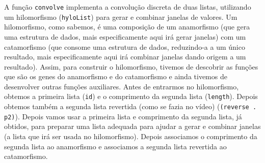 \documentclass[11pt, a4paper, fleqn]{article}
\begin{document}
\noindent A função \texttt{convolve} implementa a convolução discreta de duas listas, utilizando um hilomorfismo (\texttt{hyloList}) para gerar e combinar janelas de valores. Um hilomorfismo, como sabemos, é uma composição de um anamorfismo (que gera uma estrutura de dados, mais especificamente aqui irá gerar janelas) com um catamorfismo (que consome uma estrutura de dados, reduzindo-a a um único resultado, mais especificamente aqui irá combinar janelas dando origem a um resultado). Assim, para construir o hilomorfismo, tivemos de descobrir as funções que são os genes do anamorfismo e do catamorfismo e ainda tivemos de desenvolver outras funções
auxiliares. Antes de entrarmos no hilomorfismo, obtemos a primeira lista (\texttt{id}) e o comprimento da segunda lista (\texttt{length}).
Depois obtemos também a segunda lista revertida (como se fazia no vídeo) (\texttt{(reverse . p2)}). Depois vamos usar a primeira lista e comprimento da segunda lista, já obtidos, para preparar
uma lista adequada para ajudar a gerar e combinar janelas (a lista que irá ser usada no hilomorfismo). Depois associamos o comprimento da segunda lista ao anamorfismo e associamos a segunda lista revertida ao
catamorfismo.
\end{document}
